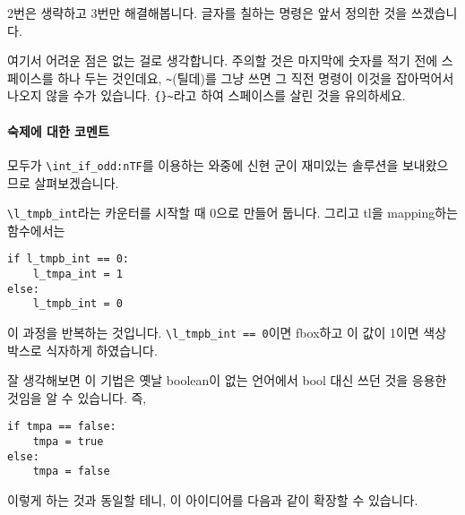 \documentclass[a4paper,amsmath]{oblivoir}
\begin{document}
2번은 생략하고 3번만 해결해봅니다. 글자를 칠하는 명령은 앞서 정의한 것을 쓰겠습니다.


여기서 어려운 점은 없는 걸로 생각합니다. 주의할 것은 마지막에 숫자를 적기 전에 스페이스를 하나 두는 것인데요, \verb|~|(틸데)를 그냥 쓰면 그 직전 명령이 이것을 잡아먹어서 나오지 않을 수가 있습니다. \verb|{}~|라고 하여 스페이스를 살린 것을 유의하세요.

\paragraph{숙제에 대한 코멘트}

모두가 \verb|\int_if_odd:nTF|를 이용하는 와중에 신현 군이 재미있는 솔루션을 보내왔으므로 살펴보겠습니다.

\verb|\l_tmpb_int|라는 카운터를 시작할 때 $0$으로 만들어 둡니다. 그리고 tl을 mapping하는 함수에서는 
\begin{verbatim}
if l_tmpb_int == 0:
    l_tmpa_int = 1
else:
    l_tmpb_int = 0
\end{verbatim}
이 과정을 반복하는 것입니다. \verb|\l_tmpb_int == 0|이면 fbox하고 이 값이 1이면 색상 박스로 식자하게 하였습니다.

잘 생각해보면 이 기법은 옛날 boolean이 없는 언어에서 bool 대신 쓰던 것을 응용한 것임을 알 수 있습니다. 즉,
\begin{verbatim}
if tmpa == false:
    tmpa = true
else:
    tmpa = false
\end{verbatim}
이렇게 하는 것과 동일할 테니, 이 아이디어를 다음과 같이 확장할 수 있습니다.

\end{document}
